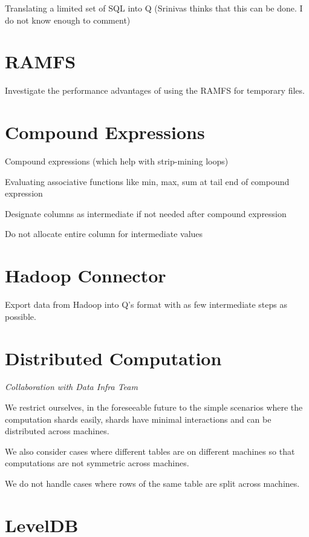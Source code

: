 Translating a limited set of SQL into Q (Srinivas
thinks that this can be done. I do not know
enough to comment)

\section{RAMFS}
\label{RAMFS}

Investigate the performance advantages of using the RAMFS for temporary
files. 

\section{Compound Expressions}
\label{Compound_Expressions}

\bi
\item Compound expressions (which help with strip-mining loops)
\item Evaluating associative functions like min, max, sum at tail end of
compound expression
\item Designate columns as intermediate if not needed after compound
expression
\item Do not allocate entire column for intermediate values
\ei
 

\section{Hadoop Connector}
Export data from Hadoop into Q's format with as few intermediate 
steps as possible.

\section{Distributed Computation}
\label{Distributed_Computation}

{\em Collaboration with Data Infra Team}

We restrict ourselves, in the foreseeable future to the simple scenarios
where the computation shards easily, shards have minimal interactions
and can be distributed across machines.

We also consider cases where different tables are on different machines
so that computations are not symmetric across machines.

We do not handle cases where rows of the same table are split across machines.

\section{LevelDB}
\label{LevelDB}

